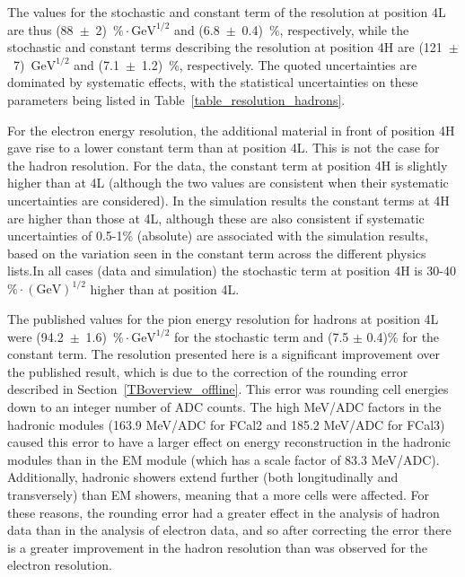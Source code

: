 The values for the stochastic and constant term of the resolution at position 4L are thus (88~$\pm$~2)~$\% \cdot \mathrm{GeV}^{1/2}$ and (6.8~$\pm$~0.4)~\%, respectively, while the stochastic and constant terms describing the resolution at position 4H are (121~$\pm$~7)~$\mathrm{GeV}^{1/2}$ and (7.1~$\pm$~1.2)~\%, respectively. The quoted uncertainties are dominated by systematic effects, with the statistical uncertainties on these parameters being listed in Table~\ref{table_resolution_hadrons}.

For the electron energy resolution, the additional material in front of position 4H gave rise to a lower constant term than at position 4L. This is not the case for the hadron resolution. For the data, the constant term at position 4H is slightly higher than at 4L (although the two values are consistent when their systematic uncertainties are considered). 
In the simulation results the constant terms at 4H are higher than those at 4L, although these are also consistent if  systematic uncertainties of 0.5-1\% (absolute) are associated with the simulation results, based on the variation seen in the constant term across the different physics lists.In all cases (data and simulation) the stochastic term at position 4H is 30-40$\% \cdot (\mathrm{GeV})^{1/2}$ higher than at position 4L.


The published values for the pion energy resolution for hadrons at position 4L were (94.2~$\pm$~1.6)~$\%\cdot\mathrm{GeV}^{1/2}$ for the stochastic term and (7.5 $\pm$ 0.4)$\%$ for the constant term. The resolution presented here is a significant improvement over the published result, which is due to the correction of the rounding error described in Section~\ref{TBoverview_offline}. This error was rounding cell energies down to an integer number of ADC counts. The high MeV/ADC factors in the hadronic modules (163.9 MeV/ADC for FCal2 and 185.2 MeV/ADC for FCal3) caused this error to have a larger effect on energy reconstruction in the hadronic modules than in the EM module (which has a scale factor of 83.3 MeV/ADC). Additionally, hadronic showers extend further (both longitudinally and transversely) than EM showers, meaning that a more cells were affected. For these reasons, the rounding error had a greater effect in the analysis of hadron data than in the analysis of electron data, and so after correcting the error there is a greater improvement in the hadron resolution than was observed for the electron resolution.



